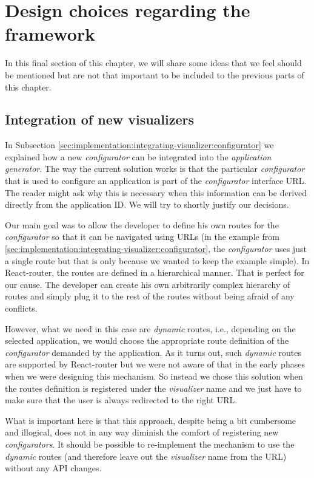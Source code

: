 \section{Design choices regarding the framework}

In this final section of this chapter, we will share some ideas that we feel should be mentioned but are not that important to be included to the previous parts of this chapter.

\subsection{Integration of new visualizers}
\label{sec:implementation:design-choices:integration}

In Subsection \ref{sec:implementation:integrating-visualizer:configurator} we explained how a new \emph{configurator} can be integrated into the \emph{application generator}. The way the current solution works is that the particular \emph{configurator} that is used to configure an application is part of the \emph{configurator} interface URL. The reader might ask why this is necessary when this information can be derived directly from the application ID. We will try to shortly justify our decisions.

Our main goal was to allow the developer to define his own routes for the \emph{configurator} so that it can be navigated using URLs  (in the example from \ref{sec:implementation:integrating-visualizer:configurator}, the \emph{configurator} uses just a single route but that is only because we wanted to keep the example simple). In  React-router, the routes are defined in a hierarchical manner. That is perfect for our cause. The developer can create his own arbitrarily complex hierarchy of routes and simply plug it to the rest of the routes without being afraid of any conflicts.

However, what we need in this case are \emph{dynamic} routes, i.e., depending on the selected application, we would choose the appropriate route definition of the \emph{configurator} demanded by the application. As it turns out, such \emph{dynamic} routes are supported by React-router but we were not aware of that in the early phases when we were designing this mechanism. So instead we chose this solution when the routes definition is registered under the \emph{visualizer} name and we just have to make sure that the user is always redirected to the right URL.

What is important here is that this approach, despite being a bit cumbersome and illogical, does not in any way diminish the comfort of registering new \emph{configurators}. It should be possible to re-implement the mechanism to use the \emph{dynamic} routes (and therefore leave out the \emph{visualizer} name from the URL) without any API changes.


